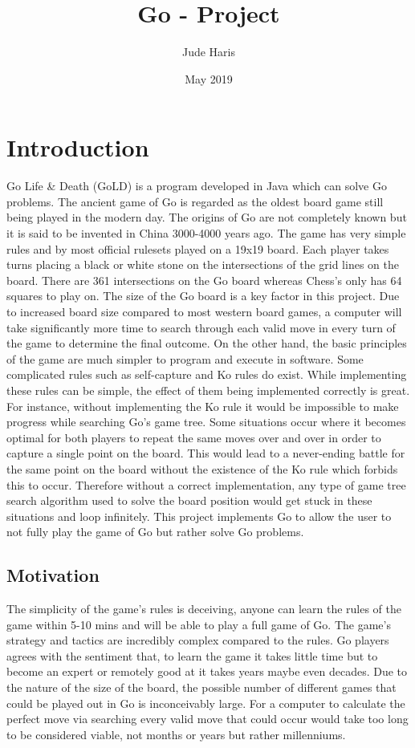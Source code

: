\documentclass{l4proj}
\title{Go - Project}
\author{Jude Haris}
\date{May 2019}
\begin{document}
\maketitle


\chapter{Introduction}
Go Life \& Death (GoLD) is a program developed in Java which can solve Go problems. The ancient game of Go is regarded as the oldest board game still being played in the modern day. The origins of Go are not completely known but it is said to be invented in China 3000-4000 years ago. The game has very simple rules and by most official rulesets played on a 19x19 board. Each player takes turns placing a black or white stone on the intersections of the grid lines on the board. There are 361 intersections on the Go board whereas Chess’s only has 64 squares to play on. The size of the Go board is a key factor in this project. Due to increased board size compared to most western board games, a computer will take significantly more time to search through each valid move in every turn of the game to determine the final outcome. On the other hand, the basic principles of the game are much simpler to program and execute in software. Some complicated rules such as self-capture and Ko rules do exist. While implementing these rules can be simple, the effect of them being implemented correctly is great. For instance, without implementing the Ko rule it would be impossible to make progress while searching Go’s game tree. Some situations occur where it becomes optimal for both players to repeat the same moves over and over in order to capture a single point on the board.  This would lead to a never-ending battle for the same point on the board without the existence of the Ko rule which forbids this to occur. Therefore without a correct implementation, any type of game tree search algorithm used to solve the board position would get stuck in these situations and loop infinitely. This project implements Go to allow the user to not fully play the game of Go but rather solve Go problems.
\section{Motivation}
The simplicity of the game's rules is deceiving, anyone can learn the rules of the game within 5-10 mins and will be able to play a full game of Go. The game's strategy and tactics are incredibly complex compared to the rules. Go players agrees with the sentiment that, to learn the game it takes little time but to become an expert or remotely good at it takes years maybe even decades. Due to the nature of the size of the board, the possible number of different games that could be played out in Go is inconceivably large. For a computer to calculate the perfect move via searching every valid move that could occur would take too long to be considered viable, not months or years but rather millenniums.
\end{document}
